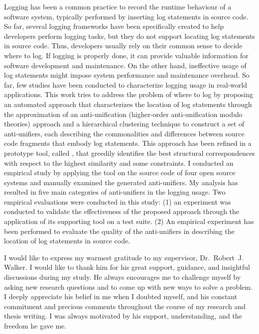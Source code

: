\documentclass{ucalgthes1}
\theoremstyle{plain}
\theoremstyle{definition}
\newcommand{\tool}{\relax}
\begin{document}
\newpage
{}
{}
Logging has been a common practice to record the runtime behaviour of a software system, typically performed by inserting log statements in source code. So far, several logging frameworks have been specifically created to help developers perform logging tasks, but they do not support locating log statements in source code. Thus, developers usually rely on their common sense to decide where to log. If logging is properly done, it can provide valuable information for software development and maintenance. On the other hand, ineffective usage of log statements might impose system performance and maintenance overhead. So far, few studies have been conducted to characterize logging usage in real-world applications. This work tries to address the problem of where to log by proposing an automated approach that characterizes the location of log statements through the approximation of an anti-unification (higher-order anti-unification modulo theories) approach and a hierarchical clustering technique to construct a set of anti-unifiers, each describing the commonalities and differences between source code fragments that embody log statements. This approach has been refined in a prototype tool, called \tool{ELUS}, that greedily identifies the best structural correspondences with respect to the highest similarity and some constraints. I conducted an empirical study by applying the tool on the source code of four open source systems and manually examined the generated anti-unifiers. My analysis has resulted in five main categories of anti-unifiers in the logging usage. Two empirical evaluations were conducted in this study: (1) an experiment was conducted to validate the effectiveness of the proposed approach through the application of its supporting tool on a test suite. (2) An empirical experiment has been performed to evaluate the quality of the anti-unifiers in describing the location of log statements in source code.
\newpage
{}
{}

I would like to express my warmest gratitude to my supervisor, Dr.~Robert~J. Walker.  I would like to thank him for his great support, guidance, and insightful discussions during my study. He always encourages me to challenge myself by asking new research questions and to come up with new ways to solve a problem. I deeply appreciate his belief in me when I doubted myself, and his constant commitment and precious comments throughout the course of my research and thesis writing. I was always motivated by his support, understanding, and the freedom he gave me.
\end{document}

